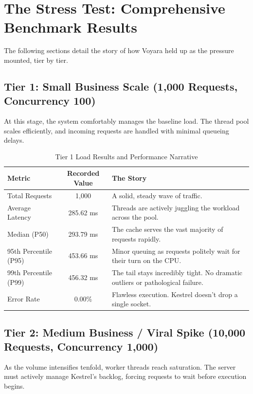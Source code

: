 \section{The Stress Test: Comprehensive Benchmark Results}
The following sections detail the story of how Voyara held up as the pressure mounted, tier by tier.

\subsection{Tier 1: Small Business Scale (1,000 Requests, Concurrency 100)}
At this stage, the system comfortably manages the baseline load. The thread pool scales efficiently, and incoming requests are handled with minimal queueing delays.

\begin{table}[H]
\centering
\renewcommand{\arraystretch}{1.3}
\begin{tabular}{|l|c|p{8cm}|}
\hline
\textbf{Metric} & \textbf{Recorded Value} & \textbf{The Story} \\ \hline
Total Requests & 1,000 & A solid, steady wave of traffic. \\ \hline
Average Latency & 285.62 ms & Threads are actively juggling the workload across the pool. \\ \hline
Median (P50) & 293.79 ms & The cache serves the vast majority of requests rapidly. \\ \hline
95th Percentile (P95) & 453.66 ms & Minor queuing as requests politely wait for their turn on the CPU. \\ \hline
99th Percentile (P99) & 456.32 ms & The tail stays incredibly tight. No dramatic outliers or pathological failure. \\ \hline
Error Rate & 0.00\% & Flawless execution. Kestrel doesn't drop a single socket. \\ \hline
\end{tabular}
\caption{Tier 1 Load Results and Performance Narrative}
\label{tab:tier1_load}
\end{table}

\subsection{Tier 2: Medium Business / Viral Spike (10,000 Requests, Concurrency 1,000)}
As the volume intensifies tenfold, worker threads reach saturation. The server must actively manage Kestrel's backlog, forcing requests to wait before execution begins.

